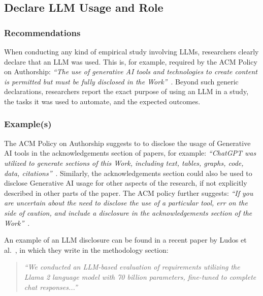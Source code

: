 



\subsection{Declare LLM Usage and Role}

\subsubsection{Recommendations}

When conducting any kind of empirical study involving LLMs, researchers \must clearly declare that an LLM was used.
This is, for example, required by the ACM Policy on Authorship: \emph{``The use of generative AI tools and technologies to create content is permitted but must be fully disclosed in the Work''}~\cite{ACM2023}.
Beyond such generic declarations, researchers \should report the exact purpose of using an LLM in a study, the tasks it was used to automate, and the expected outcomes.


\subsubsection{Example(s)}

The ACM Policy on Authorship suggests to to disclose the usage of Generative AI tools in the acknowledgements section of papers, for example: \emph{``ChatGPT was utilized to generate sections of this Work, including text, tables, graphs, code, data, citations''}~\cite{ACM2023}. 
Similarly, the acknowledgements section could also be used to disclose Generative AI usage for other aspects of the research, if not explicitly described in other parts of the paper.
The ACM policy further suggests: \emph{``If you are uncertain ­about the need to disclose the use of a particular tool, err on the side of caution, and include a disclosure in the acknowledgements section of the Work''}~\cite{ACM2023}.

An example of an LLM disclosure can be found in a recent paper by Ludos et al.~\cite{DBLP:conf/re/LubosFTGMEL24}, in which they write in the methodology section:

\begin{quote}
\it
``We conducted an LLM-based evaluation of requirements utilizing the Llama 2 language model with 70 billion parameters, fine-tuned to complete chat responses...''
\end{quote}


